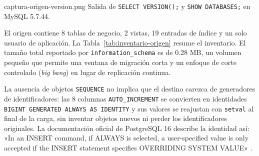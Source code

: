%
  {captura-origen-version.png}%
  {Salida de \texttt{SELECT VERSION();} y \texttt{SHOW DATABASES;} en MySQL 5.7.44.}

El origen contiene 8 tablas de negocio, 2 vistas, 19 entradas de índice y un
solo usuario de aplicación. La Tabla~\ref{tab:inventario-origen} resume el
inventario. El tamaño total reportado por \texttt{information\_schema} es de
0.28 MB, un volumen pequeño que permite una ventana de migración corta y un
enfoque de corte controlado (\emph{big bang}) en lugar de replicación continua.

\begin{table}[H]
  \centering
  \caption{Inventario de objetos del sistema de origen}
  \label{tab:inventario-origen}
\end{table}

La ausencia de objetos \texttt{SEQUENCE} no implica que el destino carezca de
generadores de identificadores: las 8 columnas \texttt{AUTO\_INCREMENT} se
convierten en identidades \texttt{BIGINT GENERATED ALWAYS AS IDENTITY} y sus
valores se reajustan con \texttt{setval} al final de la carga, sin inventar
objetos nuevos ni perder los identificadores originales. {%
La documentación oficial de PostgreSQL 16 describe la identidad así: «In an
INSERT command, if ALWAYS is selected, a user-specified value is only accepted
if the INSERT statement specifies OVERRIDING SYSTEM VALUE»
\citep[apartado «GENERATED ALWAYS AS IDENTITY»]{postgresql2024}.}


